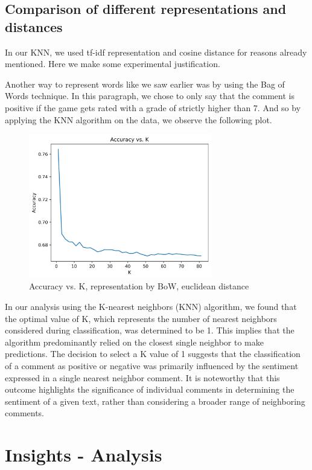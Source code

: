\documentclass{article}
\begin{document}
\subsection{Comparison of different representations and distances}

In our KNN, we used tf-idf representation and cosine distance for reasons already mentioned.
Here we make some experimental justification.

Another way to represent words like we saw earlier was by using the Bag of Words technique. In this paragraph, we chose to only say that the comment is positive if the game gets rated with a grade of strictly higher than 7. And so by applying the KNN algorithm on the data, we observe the following plot.

\begin{figure}[H]
  \centering
  \includegraphics[width=8cm]{accuracy_plot.png}
  \caption{Accuracy vs. K, representation by BoW, euclidean distance}
  \label{fig:accuracy}
\end{figure}

In our analysis using the K-nearest neighbors (KNN) algorithm, we found that the optimal value of K, which represents the number of nearest neighbors considered during classification, was determined to be 1. This implies that the algorithm predominantly relied on the closest single neighbor to make predictions. The decision to select a K value of 1 suggests that the classification of a comment as positive or negative was primarily influenced by the sentiment expressed in a single nearest neighbor comment. It is noteworthy that this outcome highlights the significance of individual comments in determining the sentiment of a given text, rather than considering a broader range of neighboring comments.

\section{Insights - Analysis}
\end{document}
